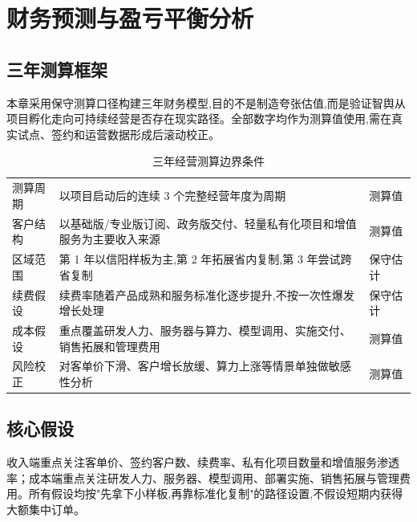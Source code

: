 \chapter{财务预测与盈亏平衡分析}

\section{三年测算框架}

本章采用保守测算口径构建三年财务模型,目的不是制造夸张估值,而是验证智舆从项目孵化走向可持续经营是否存在现实路径。全部数字均作为测算值使用,需在真实试点、签约和运营数据形成后滚动校正。

\begin{table}[htbp]
	\centering
	\caption{三年经营测算边界条件}
	\begin{tabularx}{\textwidth}{L{3.2cm}YL{3.1cm}}
		\toprule
		 &                        &  \\
		\midrule
		测算周期           & 以项目启动后的连续 3 个完整经营年度为周期               & 测算值            \\
		客户结构           & 以基础版/专业版订阅、政务版交付、轻量私有化项目和增值服务为主要收入来源 & 测算值            \\
		区域范围           & 第 1 年以信阳样板为主,第 2 年拓展省内复制,第 3 年尝试跨省复制 & 保守估计           \\
		续费假设           & 续费率随着产品成熟和服务标准化逐步提升,不按一次性爆发增长处理      & 保守估计           \\
		成本假设           & 重点覆盖研发人力、服务器与算力、模型调用、实施交付、销售拓展和管理费用  & 测算值            \\
		风险校正           & 对客单价下滑、客户增长放缓、算力上涨等情景单独做敏感性分析        & 测算值            \\
		\bottomrule
	\end{tabularx}
\end{table}

\section{核心假设}

收入端重点关注客单价、签约客户数、续费率、私有化项目数量和增值服务渗透率；成本端重点关注研发人力、服务器、模型调用、部署实施、销售拓展与管理费用。所有假设均按"先拿下小样板,再靠标准化复制"的路径设置,不假设短期内获得大额集中订单。

